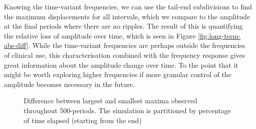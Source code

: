 Knowing the time-variant frequencies, we can use the tail-end subdivisions to find the maximum displacements for all intervals, which we compare to the amplitude at the final periods where there are no ripples.
The result of this is quantifying the relative loss of amplitude over time, which is seen in Figure \ref{fig:long-term-abs-diff}.
While the time-variant frequencies are perhaps outside the frequencies of clinical use, this characterisation combined with the frequency response gives great information about the amplitude change over time.
To the point that it might be worth exploring higher frequencies if more granular control of the amplitude becomes necessary in the future. 

\begin{figure}[h] \centering
\caption{Difference between largest and smallest maxima observed throughout 500-periods. The simulation is partitioned by percentage of time elapsed (starting from the end) }
\label{fig:long-term-rel-diff}
\end{figure}

